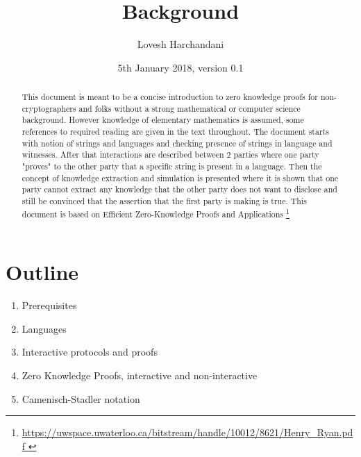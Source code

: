 \documentclass[a4paper]{article}
\title{Background}
\author{Lovesh Harchandani}
\date{5th January 2018, version 0.1}
\begin{document}
\maketitle
\begin{abstract}
  This document is meant to be a concise introduction to zero knowledge proofs for non-cryptographers and folks without a strong mathematical or computer science background. However knowledge of elementary mathematics is assumed, some references to required reading are given in the text throughout.
  The document starts with notion of strings and languages and checking presence of strings in language and witnesses. After that interactions are described between 2 parties where one party "proves" to the other party that a specific string is present in a language. Then the concept of knowledge extraction and simulation is presented where it is shown that one party cannot extract any knowledge that the other party does not want to disclose and still be convinced that the assertion that the first party is making is true. 
  This document is based on Efficient Zero-Knowledge Proofs and Applications \footnote{\url{https://uwspace.uwaterloo.ca/bitstream/handle/10012/8621/Henry_Ryan.pdf
}}
\end{abstract}

\section{Outline}
\begin{enumerate}
  \item Prerequisites
  \item Languages
  \item Interactive protocols and proofs
  \item Zero Knowledge Proofs, interactive and non-interactive
  \item Camenisch-Stadler notation
\end{enumerate}
\end{document}
